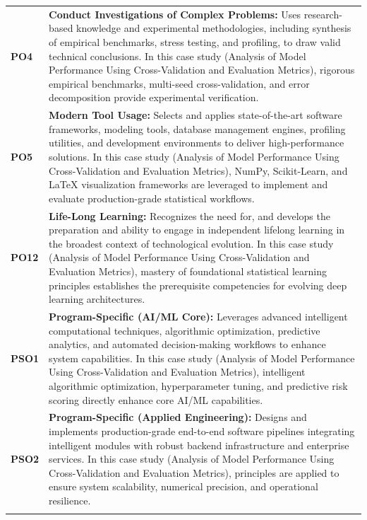 {\begin{longtable}{@{}>{\centering\arraybackslash}p{1.8cm} p{13.2cm}@{}}
    \addlinespace
\textbf{PO4} & \textbf{Conduct Investigations of Complex Problems:} Uses research-based knowledge and experimental methodologies, including synthesis of empirical benchmarks, stress testing, and profiling, to draw valid technical conclusions. In this case study (Analysis of Model Performance Using Cross-Validation and Evaluation Metrics), rigorous empirical benchmarks, multi-seed cross-validation, and error decomposition provide experimental verification. \\
    \addlinespace
\textbf{PO5} & \textbf{Modern Tool Usage:} Selects and applies state-of-the-art software frameworks, modeling tools, database management engines, profiling utilities, and development environments to deliver high-performance solutions. In this case study (Analysis of Model Performance Using Cross-Validation and Evaluation Metrics), NumPy, Scikit-Learn, and LaTeX visualization frameworks are leveraged to implement and evaluate production-grade statistical workflows. \\
    \addlinespace
\textbf{PO12} & \textbf{Life-Long Learning:} Recognizes the need for, and develops the preparation and ability to engage in independent lifelong learning in the broadest context of technological evolution. In this case study (Analysis of Model Performance Using Cross-Validation and Evaluation Metrics), mastery of foundational statistical learning principles establishes the prerequisite competencies for evolving deep learning architectures. \\
    \addlinespace
\textbf{PSO1} & \textbf{Program-Specific (AI/ML Core):} Leverages advanced intelligent computational techniques, algorithmic optimization, predictive analytics, and automated decision-making workflows to enhance system capabilities. In this case study (Analysis of Model Performance Using Cross-Validation and Evaluation Metrics), intelligent algorithmic optimization, hyperparameter tuning, and predictive risk scoring directly enhance core AI/ML capabilities. \\
    \addlinespace
\textbf{PSO2} & \textbf{Program-Specific (Applied Engineering):} Designs and implements production-grade end-to-end software pipelines integrating intelligent modules with robust backend infrastructure and enterprise services. In this case study (Analysis of Model Performance Using Cross-Validation and Evaluation Metrics), principles are applied to ensure system scalability, numerical precision, and operational resilience. \\
    \addlinespace
    \bottomrule
\end{longtable}}